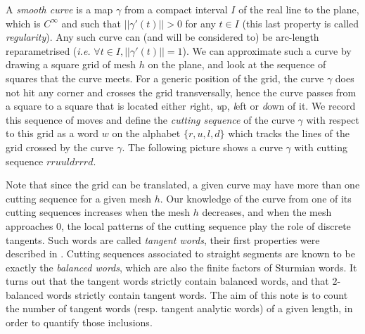 \documentclass[preliminary]{eptcs}
\begin{document}
A \emph{smooth curve} is a map $\gamma$ from a compact interval $I$ of the
real line to the plane, which is $C^\infty$ and such that $||\gamma'(t)||
> 0$ for any $t\in I$ (this last property is called \emph{regularity}).
Any such curve can (and will be considered to) be arc-length
reparametrised (\emph{i.e.} $\forall t \in I, ||\gamma'(t)|| = 1$).
\newline
We can approximate such a curve by drawing a square grid of mesh $h$ on
the plane, and look at the sequence of squares that the curve meets.
For a generic position of the grid, the curve $\gamma$ does not hit any
corner and crosses the grid transversally, hence the curve passes from a
square to a square that is located either \emph{r}ight, \emph{u}p,
\emph{l}eft or \emph{d}own of it.
We record this sequence of moves and define the \emph{cutting sequence} of
the curve $\gamma$ with respect to this grid as a word $w$ on the alphabet 
$\{r,u,l,d\}$
which tracks the lines of the grid crossed by the curve $\gamma$.
\newline
The following picture shows a curve $\gamma$ with cutting sequence
$rruuldrrrd$.
\begin{center}


\end{center}
Note that since the grid can be translated, a given curve may have more
than one cutting sequence for a given mesh $h$.
Our knowledge of the curve from one of its cutting sequences increases
when the mesh $h$ decreases, and when the mesh approaches $0$, the local
patterns of the cutting sequence play the role of discrete tangents. Such
words are called \emph{tangent words}, their first properties were
described in \cite{MonteilDGCI2011}.
Cutting sequences associated to straight segments are known to be exactly
the \emph{balanced words}, which are also the finite factors of Sturmian
words.
It turns out that the tangent words strictly contain balanced words, and
that $2$-balanced words strictly contain tangent words. The aim of this
note is to count the number of tangent words (resp. tangent analytic
words) of a given length, in order to quantify those inclusions.
\end{document}
